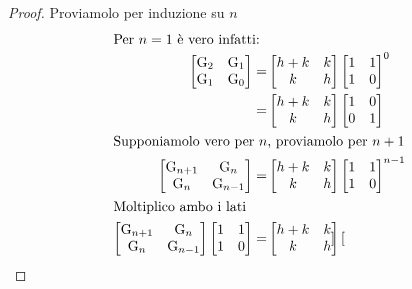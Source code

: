 \begin{proof}
Proviamolo per induzione su $n$
\begin{align*}
\intertext{Per $n=1$ è vero infatti:}
\begin{bmatrix}
	\mathrm{G}_{2}&\mathrm{G}_{1}\\\mathrm{G}_{1}&\mathrm{G}_{0}
\end{bmatrix}=&\begin{bmatrix}
		h+k&k\\k&h\\
	\end{bmatrix}\begin{bmatrix}
		1&1\\ 1&0\\
	\end{bmatrix}^{0}\\
=&\begin{bmatrix}
	h+k&k\\k&h\\
\end{bmatrix}\begin{bmatrix}
	1&0\\ 0&1\\
\end{bmatrix}\\
\intertext{Supponiamolo vero per $n$, proviamolo per $n+1$}
\begin{bmatrix}
	\mathrm{G}_{n+1}&\mathrm{G}_{n}\\\mathrm{G}_{n}&\mathrm{G}_{n-1}
\end{bmatrix}=&\begin{bmatrix}
	h+k&k\\k&h\\
\end{bmatrix}\begin{bmatrix}
	1&1\\ 1&0\\
\end{bmatrix}^{n-1}\\
\intertext{Moltiplico ambo i lati}
\begin{bmatrix}
	\mathrm{G}_{n+1}&\mathrm{G}_{n}\\\mathrm{G}_{n}&\mathrm{G}_{n-1}
\end{bmatrix}\begin{bmatrix}
1&1\\ 1&0\\
\end{bmatrix}=&\begin{bmatrix}
	h+k&k\\k&h\\
\end{bmatrix}\begin{bmatrix}

\end{bmatrix}
\end{align*}
\end{proof}
